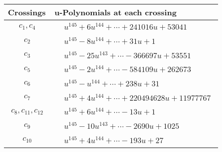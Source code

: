 \documentclass[1p]{elsarticle_modified}
\theoremstyle{definition}
\begin{document}
\begin{tabular}{m{50pt}|m{274pt}}
Crossings & \hspace{64pt}u-Polynomials at each crossing \\
\hline $$\begin{aligned}c_{1},c_{4}\end{aligned}$$&$\begin{aligned}
&u^{145}+6 u^{144}+\cdots+241016 u+53041
\end{aligned}$\\
\hline $$\begin{aligned}c_{2}\end{aligned}$$&$\begin{aligned}
&u^{145}-8 u^{144}+\cdots+31 u+1
\end{aligned}$\\
\hline $$\begin{aligned}c_{3}\end{aligned}$$&$\begin{aligned}
&u^{145}-25 u^{143}+\cdots-366697 u+53551
\end{aligned}$\\
\hline $$\begin{aligned}c_{5}\end{aligned}$$&$\begin{aligned}
&u^{145}-2 u^{144}+\cdots-584109 u+262673
\end{aligned}$\\
\hline $$\begin{aligned}c_{6}\end{aligned}$$&$\begin{aligned}
&u^{145}- u^{144}+\cdots+238 u+31
\end{aligned}$\\
\hline $$\begin{aligned}c_{7}\end{aligned}$$&$\begin{aligned}
&u^{145}+4 u^{144}+\cdots+220494628 u+11977767
\end{aligned}$\\
\hline $$\begin{aligned}c_{8},c_{11},c_{12}\end{aligned}$$&$\begin{aligned}
&u^{145}+6 u^{144}+\cdots-13 u+1
\end{aligned}$\\
\hline $$\begin{aligned}c_{9}\end{aligned}$$&$\begin{aligned}
&u^{145}-10 u^{143}+\cdots-2690 u+1025
\end{aligned}$\\
\hline $$\begin{aligned}c_{10}\end{aligned}$$&$\begin{aligned}
&u^{145}+4 u^{144}+\cdots-193 u+27
\end{aligned}$\\
\hline
\end{tabular}\\~\\
\end{document}
